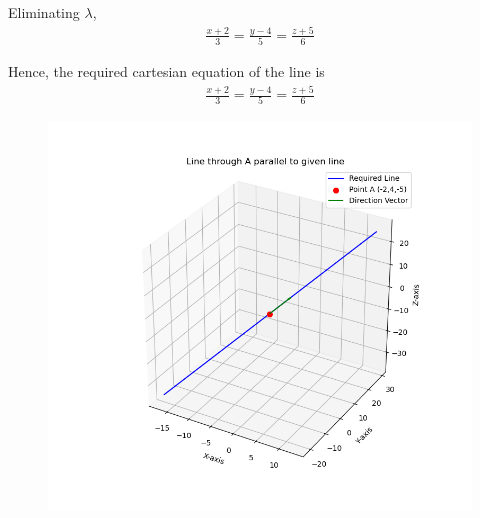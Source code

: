 \documentclass[journal]{IEEEtran}
\begin{document}
Eliminating $\lambda$,
\begin{align}
\frac{x+2}{3} = \frac{y-4}{5} = \frac{z+5}{6}
\end{align}

Hence, the required cartesian equation of the line is
\begin{align}
\boxed{\;\frac{x+2}{3} = \frac{y-4}{5} = \frac{z+5}{6}\;}
\end{align}


\begin{figure}[h!]
    \centering
    \includegraphics[height=0.5\textheight, keepaspectratio]{figs/Figure_1.png}
    \label{figure_1}
\end{figure}
\end{document}
